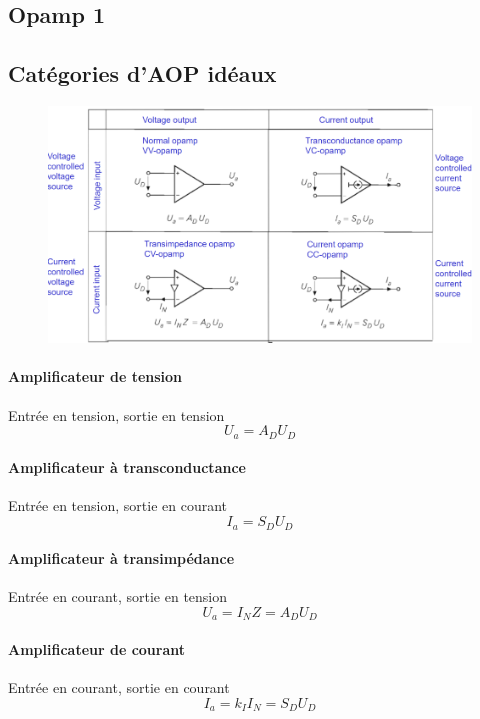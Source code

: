 \documentclass[resume]{subfiles}
\begin{document}
\begin{multicols}{3}
\section{Opamp 1}


\subsection{Catégories d'AOP idéaux}
\begin{figure}[H]
    \centering
    \includegraphics[width=\columnwidth]{../images/OpAmp1/categoriesAOP.png}
\end{figure}
\paragraph{Amplificateur de tension} Entrée en tension, sortie en tension
$$U_a=A_DU_D$$
\paragraph{Amplificateur à transconductance} Entrée en tension, sortie en courant
$$I_a=S_DU_D$$
\paragraph{Amplificateur à transimpédance} Entrée en courant, sortie en tension 
$$U_a=I_NZ=A_DU_D$$
\paragraph{Amplificateur de courant} Entrée en courant, sortie en courant
$$I_a=k_II_N=S_DU_D$$

\end{multicols}
\end{document}
